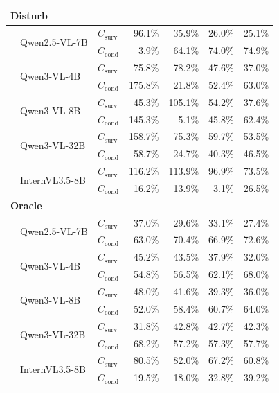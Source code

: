 \begin{table}[htbp]
\begin{tabular}{lllrrrr}
\midrule
\multicolumn{7}{l}{\textbf{Disturb}} \\
\midrule
\multirow{2}{*}{}
& \multirow{2}{*}{Qwen2.5-VL-7B} & \(C_{\mathrm{surv}}\) & 96.1\% & 35.9\% & 26.0\% & 25.1\% \\
&  & \(C_{\mathrm{cond}}\) & 3.9\% & 64.1\% & 74.0\% & 74.9\% \\
\midrule
\multirow{2}{*}{}
& \multirow{2}{*}{Qwen3-VL-4B} & \(C_{\mathrm{surv}}\) & 75.8\% & 78.2\% & 47.6\% & 37.0\% \\
&  & \(C_{\mathrm{cond}}\) & 175.8\% & 21.8\% & 52.4\% & 63.0\% \\
\midrule
\multirow{2}{*}{}
& \multirow{2}{*}{Qwen3-VL-8B} & \(C_{\mathrm{surv}}\) & 45.3\% & 105.1\% & 54.2\% & 37.6\% \\
&  & \(C_{\mathrm{cond}}\) & 145.3\% & 5.1\% & 45.8\% & 62.4\% \\
\midrule
\multirow{2}{*}{}
& \multirow{2}{*}{Qwen3-VL-32B} & \(C_{\mathrm{surv}}\) & 158.7\% & 75.3\% & 59.7\% & 53.5\% \\
&  & \(C_{\mathrm{cond}}\) & 58.7\% & 24.7\% & 40.3\% & 46.5\% \\
\midrule
\multirow{2}{*}{}
& \multirow{2}{*}{InternVL3.5-8B} & \(C_{\mathrm{surv}}\) & 116.2\% & 113.9\% & 96.9\% & 73.5\% \\
&  & \(C_{\mathrm{cond}}\) & 16.2\% & 13.9\% & 3.1\% & 26.5\% \\
\midrule
\multicolumn{7}{l}{\textbf{Oracle}} \\
\midrule
\multirow{2}{*}{}
& \multirow{2}{*}{Qwen2.5-VL-7B} & \(C_{\mathrm{surv}}\) & 37.0\% & 29.6\% & 33.1\% & 27.4\% \\
&  & \(C_{\mathrm{cond}}\) & 63.0\% & 70.4\% & 66.9\% & 72.6\% \\
\midrule
\multirow{2}{*}{}
& \multirow{2}{*}{Qwen3-VL-4B} & \(C_{\mathrm{surv}}\) & 45.2\% & 43.5\% & 37.9\% & 32.0\% \\
&  & \(C_{\mathrm{cond}}\) & 54.8\% & 56.5\% & 62.1\% & 68.0\% \\
\midrule
\multirow{2}{*}{}
& \multirow{2}{*}{Qwen3-VL-8B} & \(C_{\mathrm{surv}}\) & 48.0\% & 41.6\% & 39.3\% & 36.0\% \\
&  & \(C_{\mathrm{cond}}\) & 52.0\% & 58.4\% & 60.7\% & 64.0\% \\
\midrule
\multirow{2}{*}{}
& \multirow{2}{*}{Qwen3-VL-32B} & \(C_{\mathrm{surv}}\) & 31.8\% & 42.8\% & 42.7\% & 42.3\% \\
&  & \(C_{\mathrm{cond}}\) & 68.2\% & 57.2\% & 57.3\% & 57.7\% \\
\midrule
\multirow{2}{*}{}
& \multirow{2}{*}{InternVL3.5-8B} & \(C_{\mathrm{surv}}\) & 80.5\% & 82.0\% & 67.2\% & 60.8\% \\
&  & \(C_{\mathrm{cond}}\) & 19.5\% & 18.0\% & 32.8\% & 39.2\% \\
\bottomrule
\end{tabular}
\end{table}
